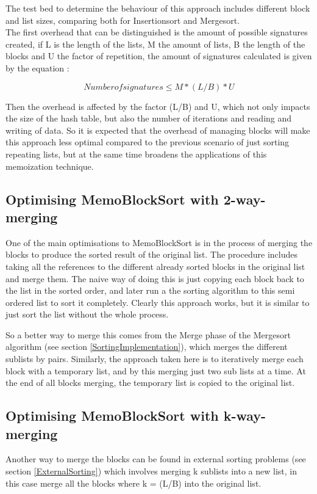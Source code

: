 \documentclass[a4paper,12pt]{article}
\begin{document}
The test bed to determine the behaviour of this approach includes different block and list sizes, comparing both for Insertionsort and Mergesort. \\

The first overhead that can be distinguished is the amount of possible signatures created, if L is the length of the lists, M the amount of lists, B the length of the blocks and U the factor of repetition, the amount of signatures calculated is given by the equation :

\begin{equation}
Number of signatures \leq  M * (L / B) * U
\end{equation}

Then the overhead is affected by the factor (L/B) and U, which not only impacts the size of the hash table, but also the number of iterations and reading and writing of data. So it is expected that the overhead of managing blocks will make this approach less optimal compared to the previous scenario of just sorting repeating lists, but at the same time broadens the applications of this memoization technique.

\subsection{Optimising MemoBlockSort with 2-way-merging}
One of the main optimisations to MemoBlockSort is in the process of merging the blocks to produce the sorted result of the original list. The procedure includes taking all the references to the different already sorted blocks in the original list and merge them. The naive way of doing this is just copying each block back to the list in the sorted order, and later run a the sorting algorithm to this semi ordered list to sort it completely. Clearly this approach works, but it is similar to just sort the list without the whole process.

So a better way to merge this comes from the Merge phase of the Mergesort algorithm (see section \ref{SortingImplementation}), which merges the different sublists by pairs. Similarly, the approach taken here is to iteratively merge each block with a temporary list, and by this merging just two sub lists at a time. At the end of all blocks merging, the temporary list is copied to the original list.

\subsection{Optimising MemoBlockSort with k-way-merging}
Another way to merge the blocks can be found in external sorting problems (see section \ref{ExternalSorting}) which involves merging k sublists into a new list, in this case merge all the blocks where k =  (L/B) into the original list.\\
\end{document}
